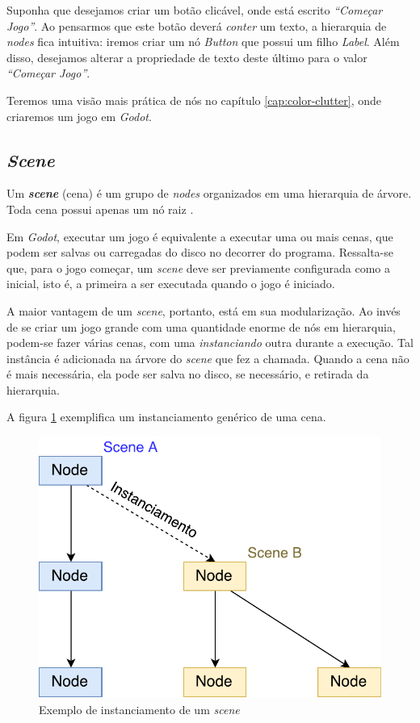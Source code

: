 Suponha que desejamos criar um botão clicável, onde está escrito \textit{``Começar Jogo''}. Ao pensarmos que este botão deverá \emph{conter} um texto, a hierarquia de \textit{nodes} fica intuitiva: iremos criar um nó \textit{Button} que possui um filho \textit{Label}. Além disso, desejamos alterar a propriedade de texto deste último para o valor \textit{``Começar Jogo''}.

Teremos uma visão mais prática de nós no capítulo \ref{cap:color-clutter}, onde criaremos um jogo em \textit{Godot}.


\subsection{\textit{Scene}}
\label{godotScene}

Um \textbf{\textit{scene}} (cena) é um grupo de \textit{nodes} organizados em uma hierarquia de árvore. Toda cena possui apenas um nó raiz \citep{godotScene}.

Em \textit{Godot}, executar um jogo é equivalente a executar uma ou mais cenas, que podem ser salvas ou carregadas do disco no decorrer do programa. Ressalta-se que, para o jogo começar, um \textit{scene} deve ser previamente configurada como a inicial, isto é, a primeira a ser executada quando o jogo é iniciado.

A maior vantagem de um \textit{scene}, portanto, está em sua modularização. Ao invés de se criar um jogo grande com uma quantidade enorme de nós em hierarquia, podem-se fazer várias cenas, com uma \emph{instanciando} outra durante a execução. Tal instância é adicionada na árvore do \textit{scene} que fez a chamada. Quando a cena não é mais necessária, ela pode ser salva no disco, se necessário, e retirada da hierarquia.

A figura \ref{sceneInstance} exemplifica um instanciamento genérico de uma cena.

\begin{figure}[H]
  \centering
  \includegraphics[width=.5\textwidth]{image/scene.pdf}
  \caption{Exemplo de instanciamento de um \textit{scene} \citep{godotScene}}
  \label{sceneInstance}
\end{figure}

